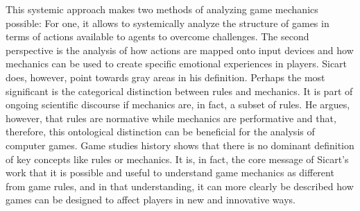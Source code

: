 This systemic approach makes two methods of analyzing game mechanics possible: For one, it allows to systemically analyze the structure of games in terms of actions available to agents to overcome challenges. The second perspective is the analysis of how actions are mapped onto input devices and how mechanics can be used to create specific emotional experiences in players. Sicart does, however, point towards gray areas in his definition. Perhaps the most significant is the categorical distinction between rules and mechanics. It is part of ongoing scientific discourse if mechanics are, in fact, a subset of rules. He argues, however, that rules are normative while mechanics are performative and that, therefore, this ontological distinction can be beneficial for the analysis of computer games. Game studies history shows that there is no dominant definition of key concepts like rules or mechanics. It is, in fact, the core message of Sicart’s work that it is possible and useful to understand game mechanics as different from game rules, and in that understanding, it can more clearly be described how games can be designed to affect players in new and innovative ways.~\cite{Sicart2008}
